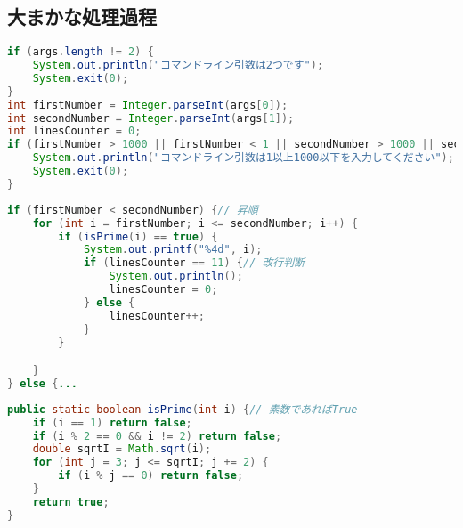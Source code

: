 \documentclass[a4j,11pt]{jsarticle}
\begin{document}
\subsection{大まかな処理過程}
\begin{lstlisting}[caption=コマンドライン引数の不正を検出, label=argsE, language=Java]
if (args.length != 2) {
    System.out.println("コマンドライン引数は2つです");
    System.exit(0);
}
int firstNumber = Integer.parseInt(args[0]);
int secondNumber = Integer.parseInt(args[1]);
int linesCounter = 0;
if (firstNumber > 1000 || firstNumber < 1 || secondNumber > 1000 || secondNumber < 1) {
    System.out.println("コマンドライン引数は1以上1000以下を入力してください");
    System.exit(0);
}
\end{lstlisting}
\begin{lstlisting}[caption=コマンドライン引数の大小比較・条件分岐, label=大小比較, language=Java]
if (firstNumber < secondNumber) {// 昇順
    for (int i = firstNumber; i <= secondNumber; i++) {
        if (isPrime(i) == true) {
            System.out.printf("%4d", i);
            if (linesCounter == 11) {// 改行判断
                System.out.println();
                linesCounter = 0;
            } else {
                linesCounter++;
            }
        }

    }
} else {...
\end{lstlisting}
\begin{lstlisting}[caption=素数判断, label=isPPrime, language=Java]
public static boolean isPrime(int i) {// 素数であればTrue
    if (i == 1) return false;
    if (i % 2 == 0 && i != 2) return false;
    double sqrtI = Math.sqrt(i);
    for (int j = 3; j <= sqrtI; j += 2) {
        if (i % j == 0) return false;
    }
    return true;
}
\end{lstlisting}
\end{document}
